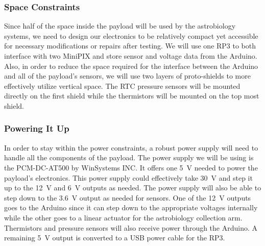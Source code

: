 \subsubsection{Space Constraints}
Since half of the space inside the payload will be used by the astrobiology systems, we need to design our electronics to be relatively compact yet accessible for necessary modifications or repairs after testing. We will use one RP3 to both interface with two MiniPIX and store sensor and voltage data from the Arduino.  Also, in order to reduce the space required for the interface between the Arduino and all of the payload's sensors, we will use two layers of proto-shields to more effectively utilize vertical space. The RTC  pressure sensors will be mounted directly on the first shield while the thermistors will be mounted on the top most shield. 

\subsubsection{Powering It Up}
 In order to stay within the power constraints, a robust power supply will need to  handle all the components of the payload.  The power supply we will be using is the PCM-DC-AT500 by WinSystems INC.  It offers one \SI{+5}{\volt} needed to power the payload's electronics.  This power supply could effectively take \SI{+30}{\volt} and step it up to the \SI{+12}{\volt} and \SI{+6}{\volt} outputs as needed. The power supply will also be able to step down to the \SI{+3.6 }{\volt} output as needed for sensors. One of the \SI{+12}{\volt} outputs goes to the Arduino since it can step down to the appropriate voltages internally while the other goes to a linear actuator for the astrobiology collection arm. Thermistors and pressure sensors will also receive power through the Arduino. A remaining \SI{+5 }{\volt} output is converted to a USB power cable for the RP3. 
